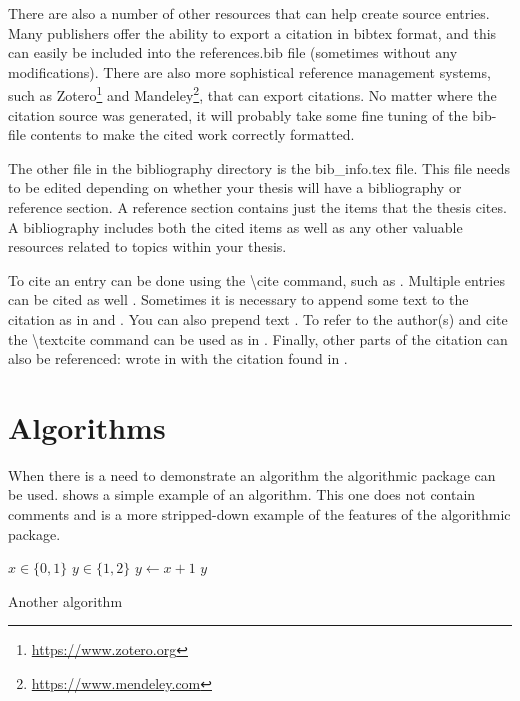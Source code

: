     There are also a number of other resources that can help create source entries.
    Many publishers offer the ability to export a citation in bibtex format, and this can easily be included into the references.bib file (sometimes without any modifications).
    There are also more sophistical reference management systems, such as Zotero\footnote{ \url{https://www.zotero.org}} and Mandeley\footnote{\url{https://www.mendeley.com}}, that can export citations.
    No matter where the citation source was generated, it will probably take some fine tuning of the bib-file contents to make the cited work correctly formatted.

    The other file in the bibliography directory is the bib\_info.tex file.
    This file needs to be edited depending on whether your thesis will have a bibliography or reference section.
    A reference section contains just the items that the thesis cites.
    A bibliography includes both the cited items as well as any other valuable resources related to topics within your thesis.

    To cite an entry can be done using the \textbackslash cite command, such as \cite{cpthesis_github}.
    Multiple entries can be cited as well \cite{drela1986a,dryden1943a,einstein1905,lopez2007a}.
    Sometimes it is necessary to append some text to the citation as in \cite[135]{dryden1943a} and \cite[section 2]{head1958a}.
    You can also prepend text \cite[such as][120]{Koutsovasilis2008}.
    To refer to the author(s) and cite the \textbackslash textcite command can be used as in \textcite{dirac1981}.
    Finally, other parts of the citation can also be referenced: \citeauthor{einstein1905} wrote  in \citeyear{einstein1905} with the citation found in \cite{einstein1905}.

\section{Algorithms} \label{sec:Algorithms}
    When there is a need to demonstrate an algorithm the algorithmic package can be used.
     shows a simple example of an algorithm.
    This one does not contain comments and is a more stripped-down example of the features of the algorithmic package.
    \begin{algorithm}
        \begin{algorithmic}
            \Require $x \in \{0,1\}$
            \Ensure $y \in \{1,2\}$
            \State $y \gets x+1$
            \State \Return $y$
        \end{algorithmic}
        \caption{Another algorithm}
        \label{alg:SecondAlgorithm}
    \end{algorithm}

